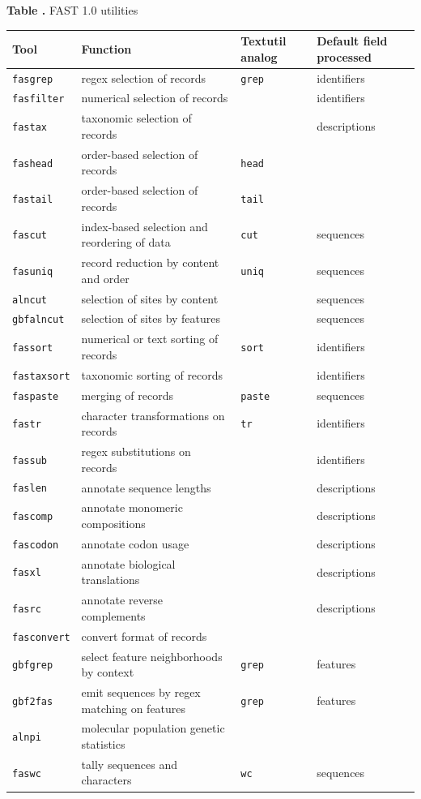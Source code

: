 \documentclass{frontiersSCNS} %
\begin{document}
\begin{table}[!t]
\textbf{\label{tab:01} Table .}{
  FAST 1.0 utilities }

\processtable{ }
{\begin{tabular}{llll}\toprule
    Tool  & Function  & Textutil analog & Default field processed  \\\midrule
    {\tt fasgrep} & regex selection of records & {\tt grep} & identifiers\\
    {\tt fasfilter} & numerical selection of records &  & identifiers \\
    {\tt fastax} & taxonomic selection of records &  & descriptions \\
    {\tt fashead} & order-based selection of records & {\tt head} & \\
    {\tt fastail} & order-based selection of records &  {\tt tail}  &  \\
    {\tt fascut} & index-based selection and reordering of data  &  {\tt cut}  & sequences \\
    {\tt fasuniq} &  record reduction by content and order & {\tt uniq} & sequences \\
    {\tt alncut} & selection of sites by content &  & sequences \\
    {\tt gbfalncut} & selection of sites by features &  & sequences \\
    {\tt fassort} & numerical or text sorting of records  & {\tt sort} & identifiers\\
    {\tt fastaxsort} & taxonomic sorting of records &  & identifiers \\
    {\tt faspaste} & merging of records &  {\tt paste} & sequences \\
    {\tt fastr} & character transformations on records & {\tt tr} & identifiers\\
    {\tt fassub} & regex substitutions on records &  & identifiers \\
    {\tt faslen} & annotate sequence lengths &  & descriptions \\
    {\tt fascomp} & annotate monomeric compositions &  & descriptions \\
    {\tt fascodon} & annotate codon usage &  & descriptions \\
    {\tt fasxl} & annotate biological translations &  & descriptions \\
    {\tt fasrc} & annotate reverse complements &  & descriptions \\
    {\tt fasconvert} & convert format of records &  &  \\
    {\tt gbfgrep} & select feature neighborhoods by context & {\tt grep}  & features \\
    {\tt gbf2fas} & emit sequences by regex matching on features  & {\tt grep}  & features\\
    {\tt alnpi} & molecular population genetic statistics &  &  \\
    {\tt faswc} & tally sequences and characters & {\tt wc} & sequences \\
\end{tabular}}{}
\end{table}
\end{document}
